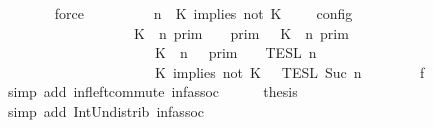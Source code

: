 \begin{isabellebody}
\ \ \ \ \ \ \isamarkupfalse%
\ force\isanewline
\ \ \ \ \isamarkupfalse%
\ \isamarkupfalse%
\ {\isacartoucheopen}{\isasymlbrakk}\ {\isasymGamma}{\isacharcomma}\ n\ {\isasymturnstile}\ {\isacharparenleft}{\isacharparenleft}K\ implies\ not\ K\ {\isacharhash}\ {\isasymPsi}{\isacharparenright}\ {\isasymtriangleright}\ {\isasymPhi}\ {\isasymrbrakk}\isactrlsub c\isactrlsub o\isactrlsub n\isactrlsub f\isactrlsub i\isactrlsub g\isanewline
\ \ \ \ \ \ \ \ \ \ \ \ \ \ \ \ \ {\isacharequal}\ {\isacharparenleft}{\isasymlbrakk}\ K\ {\isasymnot}{\isasymUp}\ n\ {\isasymrbrakk}\isactrlsub p\isactrlsub r\isactrlsub i\isactrlsub m\ {\isasyminter}\ {\isasymlbrakk}{\isasymlbrakk}\ {\isasymGamma}\ {\isasymrbrakk}{\isasymrbrakk}\isactrlsub p\isactrlsub r\isactrlsub i\isactrlsub m\ {\isasymunion}\ {\isasymlbrakk}\ K\ {\isasymUp}\ n\ {\isasymrbrakk}\isactrlsub p\isactrlsub r\isactrlsub i\isactrlsub m\isanewline
\ \ \ \ \ \ \ \ \ \ \ \ \ \ \ \ \ \ \ \ {\isasyminter}\ {\isasymlbrakk}{\isasymlbrakk}\ {\isacharparenleft}K\ {\isasymnot}{\isasymUp}\ n{\isacharparenright}\ {\isacharhash}\ {\isasymGamma}\ {\isasymrbrakk}{\isasymrbrakk}\isactrlsub p\isactrlsub r\isactrlsub i\isactrlsub m{\isacharparenright}\ {\isasyminter}\ {\isacharparenleft}{\isasymlbrakk}{\isasymlbrakk}\ {\isasymPsi}\ {\isasymrbrakk}{\isasymrbrakk}\isactrlsub T\isactrlsub E\isactrlsub S\isactrlsub L\isactrlbsup {\isasymge}\ n\isactrlesup \isanewline
\ \ \ \ \ \ \ \ \ \ \ \ \ \ \ \ \ \ \ \ {\isasyminter}\ {\isasymlbrakk}{\isasymlbrakk}\ {\isacharparenleft}K\ implies\ not\ K\ {\isacharhash}\ {\isasymPhi}\ {\isasymrbrakk}{\isasymrbrakk}\isactrlsub T\isactrlsub E\isactrlsub S\isactrlsub L\isactrlbsup {\isasymge}\ Suc\ n\isactrlesup {\isacharparenright}{\isacartoucheclose}\isanewline
\ \ \ \ \ \ \isamarkupfalse%
\ f{}\ \isamarkupfalse%
\ {\isacharparenleft}simp\ add{\isacharcolon}\ inf{\isacharunderscore}left{\isacharunderscore}commute\ inf{\isacharunderscore}assoc{\isacharparenright}\isanewline
\ \ \ \ \isamarkupfalse%
\ {\isacharquery}thesis\ \isamarkupfalse%
\ {\isacharparenleft}simp\ add{\isacharcolon}\ Int{\isacharunderscore}Un{\isacharunderscore}distrib{}\ inf{\isacharunderscore}assoc{\isacharparenright}\isanewline
\ \ \isamarkupfalse%
\isanewline

\end{isabellebody}
